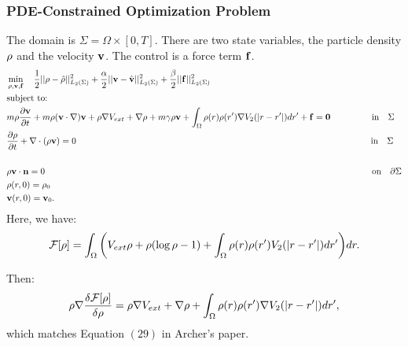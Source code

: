 
\subsubsection*{PDE-Constrained Optimization Problem}
The domain is $\Sigma=\Omega \times [0,T]$. There are two state variables, the particle density $\rho$ and the velocity $\mathbf{v}$. The control is a force term $\mathbf{f}$. 
\begin{align*}
&\min_{\Sta,\Stav,\Con } \quad \frac{1}{2}||\Sta - \hat \Sta||_{L_2(\Sigma)}^2 + \frac{\alpha}{2}||\Stav - \hat \Stav||_{L_2(\Sigma)}^2 +\frac{\beta}{2}||\Con||_{L_2(\Sigma)}^2\\
&\text{subject to:}\\
&m \Sta \frac{\partial \Stav}{\partial t} + m \Sta (\Stav \cdot \nabla)\Stav + \Sta \nabla V_{ext} + \nabla \Sta + m\gamma \Sta \Stav +\int_\Omega \rho(r) \rho(r') \nabla V_2(|r-r'|)dr'  +\Con=\mathbf{0} \ \ \ \qquad \ \ \quad\text{in} \quad \Sigma\\
&\frac{\partial \Sta}{\partial t} + \nabla \cdot (\Sta \Stav)=0 \qquad\qquad \qquad\qquad\qquad\quad \quad\quad\qquad \qquad\qquad \qquad\qquad\qquad\quad \qquad\qquad\qquad\quad\ \text{in} \quad \Sigma\\
\\
&\Sta \Stav \cdot \mathbf{n} =0\qquad\qquad \qquad\qquad\qquad\qquad\qquad\qquad\qquad \qquad\qquad \qquad\qquad\qquad \qquad\qquad\qquad\quad \qquad \text{on} \quad \partial  \Sigma\\
& \Sta(r,0)=\Sta_0\\
& \Stav(r,0)=\Stav_0.
\end{align*}
Here, we have:
\begin{align*}
\mathcal{F}[\rho]=\int_\Omega  \bigg( V_{ext}\rho + \rho (\log \rho -1) +  \int_\Omega \rho(r) \rho(r')V_2(|r-r'|)dr' \bigg) dr.
\end{align*}

Then:
\begin{align*}
\rho \nabla \frac{\delta \mathcal{F}[\rho]}{\delta \rho} = \rho \nabla V_{ext} + \nabla \rho + \int_\Omega \rho(r) \rho(r') \nabla V_2(|r-r'|)dr',
\end{align*}
which matches Equation $(29)$ in Archer's paper.
